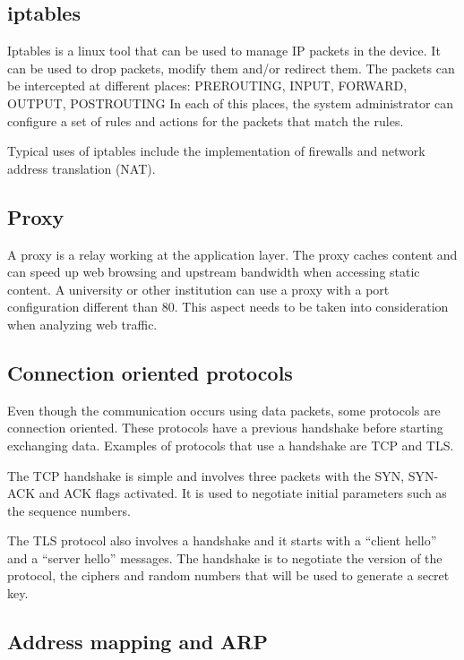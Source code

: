 \subsection{iptables}

Iptables is a linux tool that can be used to manage IP packets in the device.
It can be used to drop packets, modify them and/or redirect them.
The packets can be intercepted at different places: PREROUTING, INPUT, FORWARD, OUTPUT, POSTROUTING
In each of this places, the system administrator can configure a set of rules and actions for the packets that match the rules.

Typical uses of iptables include the implementation of firewalls and network address translation (NAT).

\subsection{Proxy}

A proxy is a relay working at the application layer.
The proxy caches content and can speed up web browsing and upstream bandwidth when accessing static content.
A university or other institution can use a proxy with a port configuration different than 80.
This aspect needs to be taken into consideration when analyzing web traffic.

\subsection{Connection oriented protocols}

Even though the communication occurs using data packets, some protocols are connection oriented.
These protocols have a previous handshake before starting exchanging data.
Examples of protocols that use a handshake are TCP and TLS.

The TCP handshake is simple and involves three packets with the SYN, SYN-ACK and ACK flags activated.
It is used to negotiate initial parameters such as the sequence numbers.

The TLS protocol also involves a handshake and it starts with a ``client hello'' and a ``server hello'' messages.
The handshake is to negotiate the version of the protocol, the ciphers and random numbers that will be used to generate a secret key.

\subsection{Address mapping and ARP}

